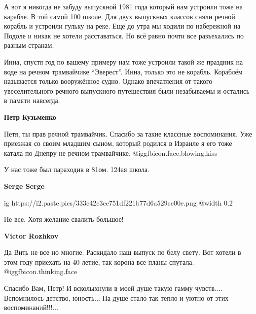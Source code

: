 \begin{itemize}

А вот я никогда не забуду выпускной 1981 года который нам устроили тоже на
карабле. В той самой 100 школе. Для двух выпускных классов сняли речной корабль
и устроили гульку на реке. Ещё до утра мы ходили по набережной на Подоле и
никак не хотели расставаться. Но всё равно почти все разъехались по разным
странам.

\begin{itemize} %

Инна, спустя год по вашему примеру нам тоже устроили такой же праздник на воде
на речном трамвайчике \enquote{Эверест}. Инна, только это не корабль. Кораблём
называется только вооружённое судно. Однако впечатления от такого
увеселительного речного выпускного путешествия были незабываемы и остались в
памяти навсегда.

\textbf{Петр Кузьменко} 

Петя, ты прав речной трамвайчик. Спасибо за такие классные воспоминания. Уже
приезжая со своим младшим сыном, который родился в Израиле я его тоже катала по
Днепру не речном трамвайчике. @igg{fbicon.face.blowing.kiss} 


У нас тоже был параходик в 81ом.
124ая школа.

\textbf{Serge Serge}

\ifcmt
  ig https://i2.paste.pics/333c42c3ce751df221b77d6a529cc00e.png
  @width 0.2
\fi

\end{itemize} %

Не все. Хотя желание свалить большое!

\textbf{Victor Rozhkov} 

Да Вить не все но многие. Раскидало наш выпуск по белу свету. Вот хотели в этом
году приехать на 40 летие, так корона все планы спутала.  @igg{fbicon.thinking.face} 


Спасибо Вам, Петр! И всколыхнули в моей душе такую гамму чувств.... Вспомнилось
детство, юность... На душе стало так тепло и уютно от этих воспоминаний!!!...

\end{itemize} %
